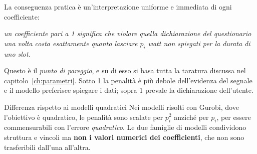 La conseguenza pratica è un'interpretazione uniforme e immediata di ogni coefficiente:
\begin{center}
\begin{minipage}{0.88\textwidth}
\itshape
un coefficiente pari a 1 significa che violare quella dichiarazione del questionario una volta
costa esattamente quanto lasciare $p_i$ watt non spiegati per la durata di uno slot.
\end{minipage}
\end{center}

Questo è il \emph{punto di pareggio}, e su di esso si basa tutta la taratura discussa nel
capitolo~\ref{ch:parametri}. Sotto 1 la penalità è più debole dell'evidenza del segnale e il
modello preferisce spiegare i dati; sopra 1 prevale la dichiarazione dell'utente.

\begin{warnbox}{Differenza rispetto ai modelli quadratici}
Nei modelli risolti con Gurobi, dove l'obiettivo è quadratico, le penalità sono scalate per
$p_i^2$ anziché per $p_i$, per essere commensurabili con l'errore \emph{quadratico}. Le due
famiglie di modelli condividono struttura e vincoli ma \textbf{non i valori numerici dei
coefficienti}, che non sono trasferibili dall'una all'altra.
\end{warnbox}
